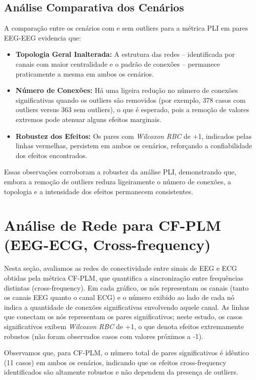 \subsection{Análise Comparativa dos Cenários}
A comparação entre os cenários com e sem outliers para a métrica PLI em pares EEG-EEG evidencia que:
\begin{itemize}
    \item \textbf{Topologia Geral Inalterada:} A estrutura das redes – identificada por canais com maior centralidade e o padrão de conexões – permanece praticamente a mesma em ambos os cenários.
    \item \textbf{Número de Conexões:} Há uma ligeira redução no número de conexões significativas quando os outliers são removidos (por exemplo, 378 casos com outliers versus 363 sem outliers), o que é esperado, pois a remoção de valores extremos pode atenuar alguns efeitos marginais.
    \item \textbf{Robustez dos Efeitos:} Os pares com \emph{Wilcoxon RBC} de +1, indicados pelas linhas vermelhas, persistem em ambos os cenários, reforçando a confiabilidade dos efeitos encontrados.
\end{itemize}

Essas observações corroboram a robustez da análise PLI, demonstrando que, embora a remoção de outliers reduza ligeiramente o número de conexões, a topologia e a intensidade dos efeitos permanecem consistentes.

\section{Análise de Rede para CF-PLM (EEG-ECG, Cross-frequency)}
\label{sec:rede_cfplm_eeg_ecg}

Nesta seção, avaliamos as redes de conectividade entre sinais de EEG e ECG obtidas pela métrica CF-PLM, que quantifica a sincronização entre frequências distintas (cross-frequency). Em cada gráfico, os nós representam os canais (tanto os canais EEG quanto o canal ECG) e o número exibido ao lado de cada nó indica a quantidade de conexões significativas envolvendo aquele canal. As linhas que conectam os nós representam os pares significativos; neste estudo, os casos significativos exibem \emph{Wilcoxon RBC} de +1, o que denota efeitos extremamente robustos (não foram observados casos com valores próximos a -1).

Observamos que, para CF-PLM, o número total de pares significativos é idêntico (11 casos) em ambos os cenários, indicando que os efeitos cross-frequency identificados são altamente robustos e não dependem da presença de outliers.

